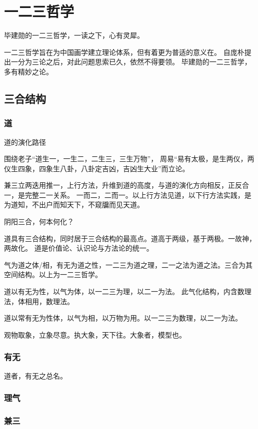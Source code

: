 \chapter{一二三哲学}

毕建勋的一二三哲学，一读之下，心有灵犀。

一二三哲学旨在为中国画学建立理论体系，但有着更为普适的意义在。
自庞朴提出一分为三论之后，对此问题思索已久，依然不得要领。
毕建勋的一二三哲学，多有精妙之论。

\section{三合结构}

\subsection{道}

道的演化路径

围绕老子“道生一，一生二，二生三，三生万物”，
周易“易有太极，是生两仪，两仪生四象，四象生八卦，八卦定吉凶，吉凶生大业”而立论。

兼三立两迭用推一，上行方法，升维到道的高度，与道的演化方向相反，正反合一，是完整二一关系。
一而二，二而一。以上行方法见道，以下行方法实践，是为道知，不出户而知天下，不窥牖而见天道。

阴阳三合，何本何化？

道具有三合结构，同时居于三合结构的最高点。道高于两级，基于两极。一故神，两故化。
道是价值论、认识论与方法论的统一。

气为道之体/相，有无为道之性，一二三为道之理，二一之法为道之法。三合为其空间结构。以上为一二三哲学。

道以有无为性，以气为体，以一二三为理，以二一为法。
此气化结构，内含数理法，体相用，数理法。

道以常有无为性体，以气为相，以万物为用。以一二三为数理，以二一为法。

观物取象，立象尽意。执大象，天下往。大象者，模型也。

\subsection{有无}

道者，有无之总名。

\subsection{理气}

\subsection{兼三}

